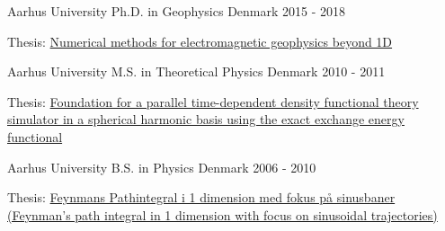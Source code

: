 

\begin{cventries}

  \cventry
  {Aarhus University} %
  {Ph.D. in Geophysics} %
    {Denmark} %
    {2015 - 2018} %
    {
      \begin{cvitems} %
        \item {Thesis: \href{https://www.forskningsdatabasen.dk/en/catalog/2392633187}{Numerical methods for electromagnetic geophysics beyond 1D}}
      \end{cvitems}
    }

  \cventry
  {Aarhus University} %
  {M.S. in Theoretical Physics} %
    {Denmark} %
    {2010 - 2011} %
    {
      \begin{cvitems} %
        \item {Thesis: \href{https://phys.au.dk/fileadmin/site_files/forskning/ltc/theses/thesistue.pdf}{Foundation for a parallel time-dependent density functional theory simulator in a spherical harmonic basis using the exact exchange energy functional}}
      \end{cvitems}
    }

  \cventry
  {Aarhus University} %
  {B.S. in Physics} %
    {Denmark} %
    {2006 - 2010} %
    {
      \begin{cvitems} %
        \item {Thesis: \href{https://users-phys.au.dk/~fedorov/subatom/bachelor/tue-feynman-path.pdf}{Feynmans Pathintegral i 1 dimension med fokus på sinusbaner (Feynman's path integral in 1 dimension with focus on sinusoidal \mbox{trajectories})}}
      \end{cvitems}
    }

\end{cventries}

